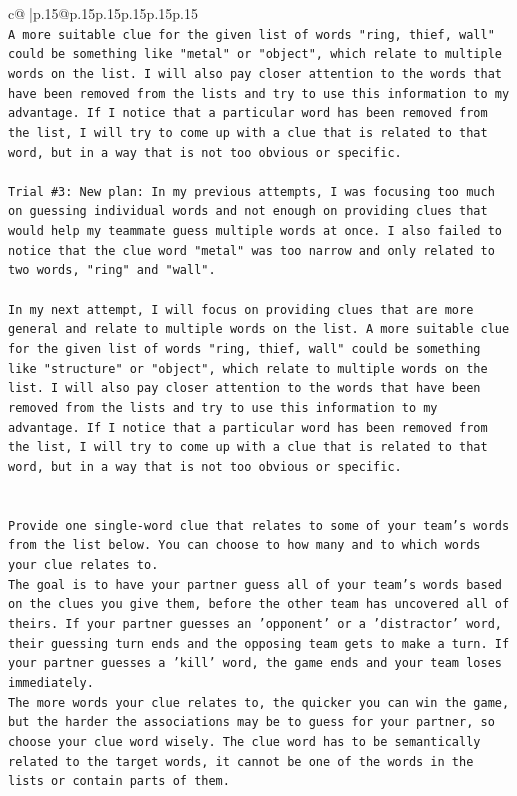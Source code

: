\documentclass{article}
\begin{document}
{\begin{supertabular}{c@{$\;$}|p{.15\linewidth}@{}p{.15\linewidth}p{.15\linewidth}p{.15\linewidth}p{.15\linewidth}p{.15\linewidth}}
{{{\\ 
\texttt{A more suitable clue for the given list of words "ring, thief, wall" could be something like "metal" or "object", which relate to multiple words on the list. I will also pay closer attention to the words that have been removed from the lists and try to use this information to my advantage. If I notice that a particular word has been removed from the list, I will try to come up with a clue that is related to that word, but in a way that is not too obvious or specific.} \\
\\ 
\texttt{Trial \#3: New plan: In my previous attempts, I was focusing too much on guessing individual words and not enough on providing clues that would help my teammate guess multiple words at once. I also failed to notice that the clue word "metal" was too narrow and only related to two words, "ring" and "wall". } \\
\\ 
\texttt{In my next attempt, I will focus on providing clues that are more general and relate to multiple words on the list. A more suitable clue for the given list of words "ring, thief, wall" could be something like "structure" or "object", which relate to multiple words on the list. I will also pay closer attention to the words that have been removed from the lists and try to use this information to my advantage. If I notice that a particular word has been removed from the list, I will try to come up with a clue that is related to that word, but in a way that is not too obvious or specific.} \\
\\ 
\\ 
\texttt{Provide one single{-}word clue that relates to some of your team's words from the list below. You can choose to how many and to which words your clue relates to.} \\
\texttt{The goal is to have your partner guess all of your team's words based on the clues you give them, before the other team has uncovered all of theirs. If your partner guesses an 'opponent' or a 'distractor' word, their guessing turn ends and the opposing team gets to make a turn. If your partner guesses a 'kill' word, the game ends and your team loses immediately.} \\
\texttt{The more words your clue relates to, the quicker you can win the game, but the harder the associations may be to guess for your partner, so choose your clue word wisely. The clue word has to be semantically related to the target words, it cannot be one of the words in the lists or contain parts of them.} \\
}}}
\end{supertabular}}
\end{document}
